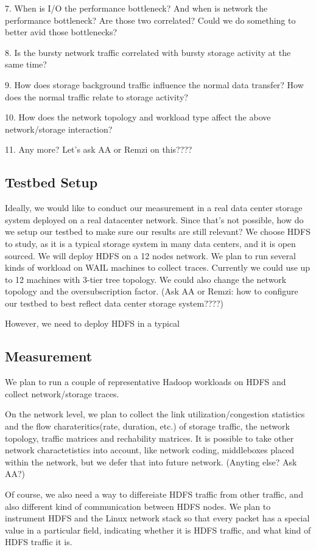 7. When is I/O the performance bottleneck? And when is network the performance bottleneck? Are those two correlated? Could we do something to better avid those bottlenecks?

8. Is the bursty network traffic correlated with bursty storage activity at the same time? 

9. How does storage background traffic influence the normal data transfer? How does the normal traffic relate to storage activity?

10. How does the network topology and workload type affect the above network/storage interaction?

11. Any more? Let's ask AA or Remzi on this????




\subsection {\bf Testbed Setup}
Ideally, we would like to conduct our measurement in a real data center storage system deployed on a real datacenter network. Since that’s not possible, how do we setup our testbed to make sure our results are still relevant? 
We choose HDFS to study, as it is a typical storage system in many data centers, and it is open sourced. We will deploy HDFS on a 12 nodes network. We plan to run several kinds of workload on WAIL machines to collect traces. Currently we could use up to 12 machines with 3-tier tree topology. We could also change the network topology and the oversubscription factor. 
(Ask AA or Remzi: how to configure our testbed to best reflect data center storage system????)

However, we need to deploy HDFS in a typical 

\subsection {\bf Measurement}
We plan to run a couple of representative Hadoop workloads on HDFS and collect network/storage traces.

On the network level, we plan to collect the link utilization/congestion statistics and the flow charateritics(rate, duration, etc.) of storage traffic, the network topology, traffic matrices and rechability matrices. It is possible to take other network charactetistics into account, like network coding, middleboxes placed within the network, but we defer that into future network. (Anyting else? Ask AA?)

Of course, we also need a way to differeiate HDFS traffic from other traffic, and also different kind of communication between HDFS nodes. We plan to instrument HDFS and the Linux network stack so that every packet has a special value in a particular field, indicating whether it is HDFS traffic, and what kind of HDFS traffic it is.

